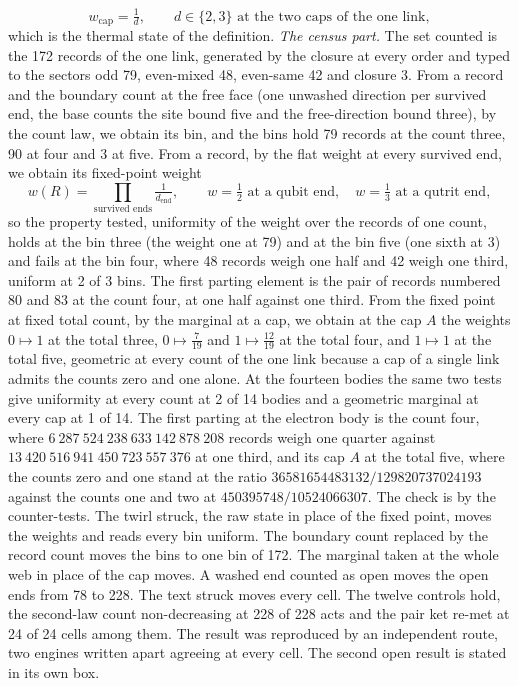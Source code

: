 \begin{chproof}
\begin{equation}
w_{\mathrm{cap}} = \tfrac{1}{d}, \qquad d \in \{2, 3\} \text{ at the two caps of the one link},
\end{equation}
which is the thermal state of the definition.
\emph{The census part.} The set counted is the 172 records of the one link, generated by the closure at every order and typed to the sectors odd 79, even-mixed 48, even-same 42 and closure 3. From a record and the boundary count at the free face (one unwashed direction per survived end, the base counts the site bound five and the free-direction bound three), by the count law, we obtain its bin, and the bins hold 79 records at the count three, 90 at four and 3 at five. From a record, by the flat weight at every survived end, we obtain its fixed-point weight
\begin{equation}
w(R) = \prod_{\text{survived ends}} \tfrac{1}{d_{\mathrm{end}}}, \qquad w = \tfrac{1}{2} \text{ at a qubit end}, \quad w = \tfrac{1}{3} \text{ at a qutrit end},
\end{equation}
so the property tested, uniformity of the weight over the records of one count, holds at the bin three (the weight one at 79) and at the bin five (one sixth at 3) and fails at the bin four, where 48 records weigh one half and 42 weigh one third, uniform at 2 of 3 bins. The first parting element is the pair of records numbered 80 and 83 at the count four, at one half against one third. From the fixed point at fixed total count, by the marginal at a cap, we obtain at the cap $A$ the weights $0 \mapsto 1$ at the total three, $0 \mapsto \tfrac{7}{19}$ and $1 \mapsto \tfrac{12}{19}$ at the total four, and $1 \mapsto 1$ at the total five, geometric at every count of the one link because a cap of a single link admits the counts zero and one alone. At the fourteen bodies the same two tests give uniformity at every count at 2 of 14 bodies and a geometric marginal at every cap at 1 of 14. The first parting at the electron body is the count four, where $6\ 287\ 524\ 238\ 633\ 142\ 878\ 208$ records weigh one quarter against $13\ 420\ 516\ 941\ 450\ 723\ 557\ 376$ at one third, and its cap $A$ at the total five, where the counts zero and one stand at the ratio $36581654483132/129820737024193$ against the counts one and two at $450395748/10524066307$.
The check is by the counter-tests. The twirl struck, the raw state in place of the fixed point, moves the weights and reads every bin uniform. The boundary count replaced by the record count moves the bins to one bin of 172. The marginal taken at the whole web in place of the cap moves. A washed end counted as open moves the open ends from 78 to 228. The text struck moves every cell. The twelve controls hold, the second-law count non-decreasing at 228 of 228 acts and the pair ket re-met at 24 of 24 cells among them.
The result was reproduced by an independent route, two engines written apart agreeing at every cell. The second open result is stated in its own box.
\end{chproof}

